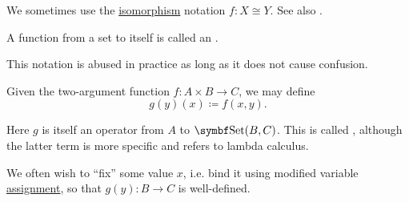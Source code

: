 \begin{definition}
\begin{DefEnum}
    We sometimes use the \hyperref[def:morphism_invertibility/isomorphism]{isomorphism} notation \( f: X \cong Y \). See also .
  \end{DefEnum}
\end{definition}

\begin{definition}\label{def:endofunction}
  A function from a set to itself is called an .
\end{definition}

\begin{definition}\label{def:currying}
  This notation is abused in practice as long as it does not cause confusion.

  Given the two-argument function \( f: A \times B \to C \), we may define
  \begin{equation*}
    g(y)(x) \coloneqq f(x, y).
  \end{equation*}

  Here \( g \) is itself an operator from \( A \) to \( \Cat{Set}(B, C) \). This is called , although the latter term is more specific and refers to lambda calculus.

  We often wish to \enquote{fix} some value \( x \), i.e. bind it using modified variable \hyperref[def:first_order_variable_assignment]{assignment}, so that \( g(y): B \to C \) is well-defined.
\end{definition}

